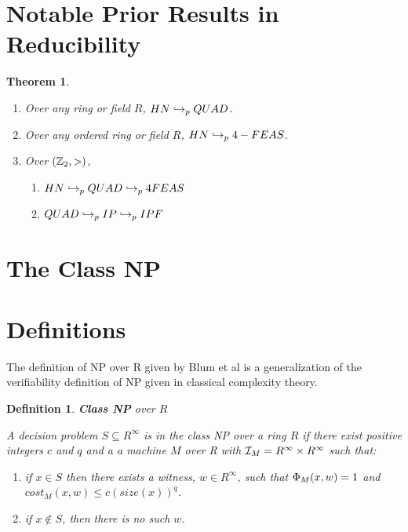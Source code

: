 \documentclass[twoside]{article}
\newtheorem{theorem}{Theorem}[section]
\newtheorem{definition}{Definition}[section]
\begin{document}

\section{Notable Prior Results in Reducibility}

\begin{theorem}
  \begin{enumerate}
  \item Over any ring or field $R$, $HN \hookrightarrow_p QUAD$.
  \item Over any ordered ring or field $R$, $HN \hookrightarrow_p 4-FEAS$.
  \item Over $(\mathbb{Z}_2, >)$, 
    \begin{enumerate}
    \item $HN \hookrightarrow_p QUAD \hookrightarrow_p 4FEAS$
    \item $QUAD \hookrightarrow_p IP \hookrightarrow_p IPF$
    \end{enumerate}
  \end{enumerate}
\end{theorem}

\section{The Class NP}

\section{Definitions}

The definition of NP over R given by Blum et al is a generalization of
the verifiability definition of NP given in classical complexity theory.

\begin{definition}{\textbf{Class NP} over $R$}

  A decision problem $S \subseteq R^\infty$ is in the class NP over a
  ring $R$ if there exist positive integers $c$ and $q$ and a a
  machine $M$ over R with $\mathcal{I}_M = R^\infty \times R^\infty$ such
  that:

  \begin{enumerate}
  \item if $x \in S$ then there exists a \emph{witness}, $w
    \in R^\infty$, such that $\Phi_M(x,w) = 1$ and
    $cost_M(x,w) \leq c(size(x))^q$.
  \item if $x \notin S$, then there is no such $w$.
  \end{enumerate}
\end{definition}
\end{document}

